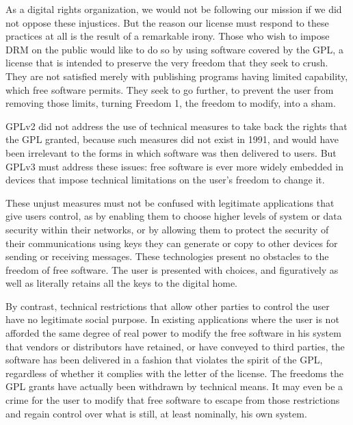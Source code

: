 
As a digital rights organization, we would not be following our mission if we
did not oppose these injustices.  But the reason our license must respond to
these practices at all is the result of a remarkable irony. Those who wish to
impose DRM on the public would like to do so by using software covered by the
GPL, a license that is intended to preserve the very freedom that they seek
to crush.  They are not satisfied merely with publishing programs having
limited capability, which free software permits. They seek to go further, to
prevent the user from removing those limits, turning Freedom 1, the freedom
to modify, into a sham.

GPLv2 did not address the use of technical measures to take back the rights
that the GPL granted, because such measures did not exist in 1991, and would
have been irrelevant to the forms in which software was then delivered to
users.  But GPLv3 must address these issues: free software is ever more
widely embedded in devices that impose technical limitations on the user's
freedom to change it.

These unjust measures must not be confused with legitimate applications that
give users control, as by enabling them to choose higher levels of system or
data security within their networks, or by allowing them to protect the
security of their communications using keys they can generate or copy to
other devices for sending or receiving messages.  These technologies present
no obstacles to the freedom of free software. The user is presented with
choices, and figuratively as well as literally retains all the keys to the
digital home.

By contrast, technical restrictions that allow other parties to control the
user have no legitimate social purpose.  In existing applications where the
user is not afforded the same degree of real power to modify the free
software in his system that vendors or distributors have retained, or have
conveyed to third parties, the software has been delivered in a fashion that
violates the spirit of the GPL, regardless of whether it complies with the
letter of the license. The freedoms the GPL grants have actually been
withdrawn by technical means.  It may even be a crime for the user to modify
that free software to escape from those restrictions and regain control over
what is still, at least nominally, his own system.


